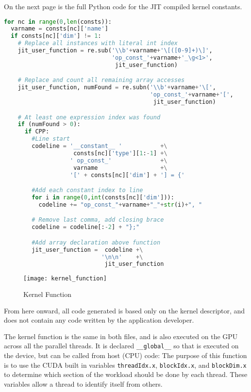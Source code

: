 On the next page is the full Python code for the JIT compiled kernel constants.
\clearpage
\begin{lstlisting}[backgroundcolor = \color{lightgray!20}, language=Python]
for nc in range(0,len(consts)):
  varname = consts[nc]['name']
  if consts[nc]['dim'] != 1:
    # Replace all instances with literal int index
    jit_user_function = re.sub('\\b'+varname+'\[([0-9]+)\]',
                               'op_const_'+varname+'_\g<1>',
                                jit_user_function)

    # Replace and count all remaining array accesses
    jit_user_function, numFound = re.subn('\\b'+varname+'\[',
                                          'op_const_'+varname+'[',
                                           jit_user_function)

    # At least one expression index was found
    if (numFound > 0):
      if CPP:
        #Line start
        codeline = '__constant__ '           +\
                    consts[nc]['type'][1:-1] +\
                   ' op_const_'              +\
                    varname                  +\
                   '[' + consts[nc]['dim'] + '] = {'

        #Add each constant index to line
        for i in range(0,int(consts[nc]['dim'])):
          codeline += "op_const_"+varname+"_"+str(i)+", "

        # Remove last comma, add closing brace
        codeline = codeline[:-2] + "};"

        #Add array declaration above function
        jit_user_function =  codeline +\
                            '\n\n'    +\
                             jit_user_function
\end{lstlisting}
\clearpage
\begin{wrapfigure}[14]{r}{.33\textwidth}
  \centering
  \caption{Kernel Function}
  \label{fig:krnl_func}
  \texttt{[image: kernel\_function]}
\end{wrapfigure}
\minititle{Kernel Function}
From here onward, all code generated is based only on the kernel descriptor, and does not contain any code written by the application developer.
\par The kernel function is the same in both files, and is also executed on the GPU across all the parallel threads. It is declared \verb|__global__| so that is executed on the device, but can be called from host (CPU) code:
The purpose of this function is to use the CUDA built in variables \verb|threadIdx.x|, \verb|blockIdx.x|, and \verb|blockDim.x| to determine which section of the workload should be done by each thread. These variables allow a thread to identify itself from others.

